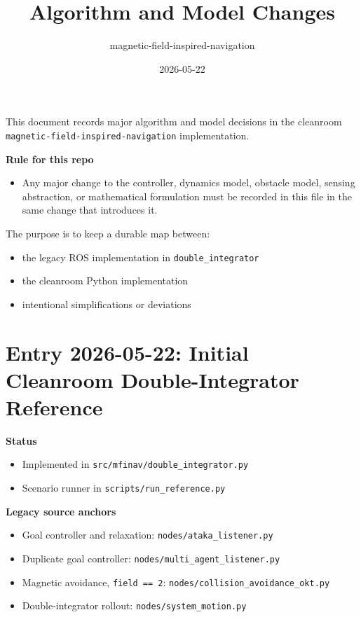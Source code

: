 \documentclass[11pt]{article}
\title{Algorithm and Model Changes}
\author{magnetic-field-inspired-navigation}
\date{2026-05-22}
\begin{document}
\maketitle

This document records major algorithm and model decisions in the cleanroom
\texttt{magnetic-field-inspired-navigation} implementation.

\textbf{Rule for this repo}

\begin{itemize}[leftmargin=*]
  \item Any major change to the controller, dynamics model, obstacle model, sensing abstraction, or mathematical formulation must be recorded in this file in the same change that introduces it.
\end{itemize}

The purpose is to keep a durable map between:

\begin{itemize}[leftmargin=*]
  \item the legacy ROS implementation in \texttt{double\_integrator}
  \item the cleanroom Python implementation
  \item intentional simplifications or deviations
\end{itemize}

\section*{Entry 2026-05-22: Initial Cleanroom Double-Integrator Reference}

\textbf{Status}

\begin{itemize}[leftmargin=*]
  \item Implemented in \texttt{src/mfinav/double\_integrator.py}
  \item Scenario runner in \texttt{scripts/run\_reference.py}
\end{itemize}

\textbf{Legacy source anchors}

\begin{itemize}[leftmargin=*]
  \item Goal controller and relaxation: \texttt{nodes/ataka\_listener.py}
  \item Duplicate goal controller: \texttt{nodes/multi\_agent\_listener.py}
  \item Magnetic avoidance, \texttt{field == 2}: \texttt{nodes/collision\_avoidance\_okt.py}
  \item Double-integrator rollout: \texttt{nodes/system\_motion.py}
\end{itemize}
\end{document}
